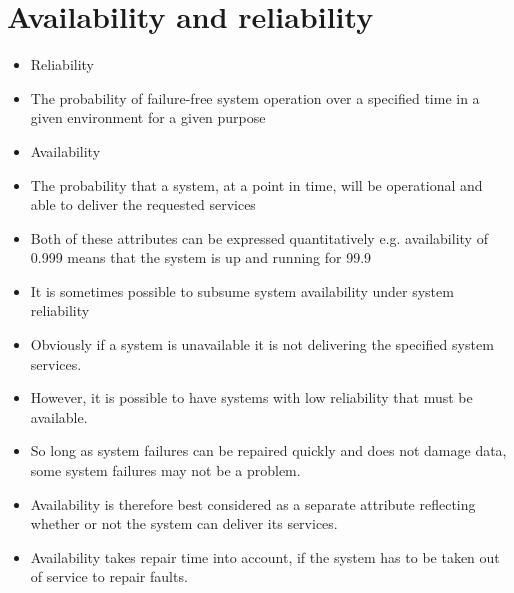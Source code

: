 \section{Availability and reliability}
\begin{itemize}
\item Reliability

  \item The probability of failure-free system operation over a specified time in a given environment for a given purpose

\item Availability

  \item The probability that a system, at a point in time, will be operational and able to deliver the requested services

\item Both of these attributes can be expressed quantitatively e.g. availability of 0.999 means that the system is up and running for 99.9%

\item It is sometimes possible to subsume system availability under system reliability

  \item Obviously if a system is unavailable it is not delivering the specified system services.

\item However, it is possible to have systems with low reliability that must be available.

  \item So long as system failures can be repaired quickly and does not damage data, some system failures may not be a problem.

\item Availability is therefore best considered as a separate attribute reflecting whether or not the system can deliver its services.

\item Availability takes repair time into account, if the system has to be taken out of service to repair faults.

\end{itemize}

